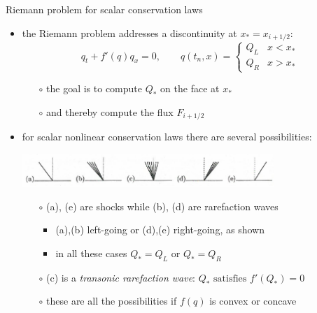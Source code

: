 \documentclass[10pt,dvipsnames,usepdftitle=false,
hyperref={pdftitle = {Finite volume methods},
    pdfauthor = {Ed Bueler}}]{beamer}
\begin{document}
\begin{frame}{Riemann problem for scalar conservation laws}

\begin{itemize}
\item the Riemann problem addresses a discontinuity at $x_*=x_{i+1/2}$:
    $$q_t + f'(q)q_x = 0, \qquad q(t_n,x) = \begin{cases} Q_L & x < x_* \\ Q_R & x > x_* \end{cases}$$

    \begin{itemize}
    \item[$\circ$] the goal is to compute $Q_*$ on the face at $x_*$
    \item[$\circ$] and thereby compute the flux $F_{i+1/2}$
    \end{itemize}
\item for scalar nonlinear conservation laws there are several possibilities:

\begin{center}
\includegraphics[width=0.75\textwidth]{figs/leveque12p1}
\end{center}

    \begin{itemize}
    \item[$\circ$] (a), (e) are shocks while (b), (d) are rarefaction waves
        \begin{itemize}
        \item (a),(b) left-going or (d),(e) right-going, as shown
        \item in all these cases $Q_*=Q_L$ or $Q_*=Q_R$
        \end{itemize}
    \item[$\circ$] (c) is a \emph{transonic rarefaction wave}: $Q_* \text{ satisfies } f'(Q_*)=0$
    \item[$\circ$] these are all the possibilities if $f(q)$ is convex or concave
    \end{itemize}
\end{itemize}
\end{frame}
\end{document}
